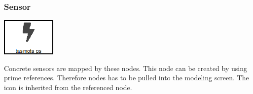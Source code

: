 \subsubsection{Sensor}
\noindent\begin{minipage}{0.15\textwidth}%
	\includegraphics[width=\linewidth]{assets/images/sensor}
\end{minipage}%
\hfill%
\begin{minipage}{0.8\textwidth}
	Concrete sensors are mapped by these nodes. This node can be created by using prime references. Therefore  nodes has to be pulled into the modeling screen. The icon is inherited from the referenced node.
\end{minipage}

